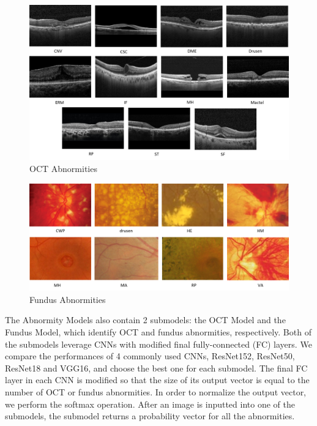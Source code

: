 \documentclass{article}
\begin{document}
	\begin{figure}[htbp]
		\centering
		\includegraphics[width=\linewidth]{Figs/OCT_Abnormities.png}
		\caption{OCT Abnormities}
		\vspace{0.3cm}
		\label{fig:OCT_abnormities}
	\end{figure}
	
	\begin{figure}[htbp]
		\centering
		\includegraphics[width=\linewidth]{Figs/fundus_Abnormities.png}
		\caption{Fundus Abnormities}
		\vspace{0.3cm}
		\label{fig:fundus_abnormities}
	\end{figure}
	
	The Abnormity Models also contain 2 submodels: the OCT Model and the Fundus Model, which identify OCT and fundus abnormities, respectively. Both of the submodels leverage CNNs with modified final fully-connected (FC) layers. We compare the performances of 4 commonly used CNNs, ResNet152, ResNet50, ResNet18 and VGG16, and choose the best one for each submodel. The final FC layer in each CNN is modified so that the size of its output vector is equal to the number of OCT or fundus abnormities. In order to normalize the output vector, we perform the softmax operation. After an image is inputted into one of the submodels, the submodel returns a probability vector for all the abnormities.
	
\end{document}
